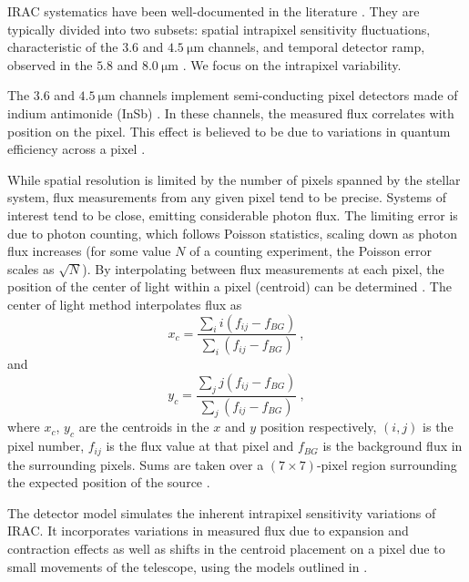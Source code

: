 \documentclass[twocolumn]{aastex61}
\begin{document}
IRAC systematics have been well-documented in the literature \citep[e.g.][]{charbonneau2005,agol2010,stevenson2012}.
They are typically divided into two subsets: spatial intrapixel sensitivity fluctuations, characteristic of the $3.6$ and $4.5~\mathrm{\mu m}$ channels, and temporal detector ramp, observed in the $5.8$ and $8.0~\mathrm{\mu m}$ \citep{charbonneau2005,evans2015}. We focus on the intrapixel variability.

The $3.6$ and $4.5~\mathrm{\mu m}$ channels implement semi-conducting pixel detectors made of indium antimonide (InSb) \citep{evans2015}. In these channels, the measured flux correlates with position on the pixel. This effect is believed to be due to variations in quantum efficiency across a pixel \citep{evans2015}.

While spatial resolution is limited by the number of pixels spanned by the stellar system, flux measurements from any given pixel tend to be precise. Systems of interest tend to be close, emitting considerable photon flux. The limiting error is due to photon counting, which follows Poisson statistics, scaling down as photon flux increases (for some value $N$ of a counting experiment, the Poisson error scales as $\sqrt{N}$). By interpolating between flux measurements at each pixel, the position of the center of light within a pixel (centroid) can be determined \citep{ingalls2016}. The center of light method interpolates flux as
\begin{equation}
  x_{c} = \dfrac{\sum_{i} i\left(f_{ij}-f_{BG}\right)}{\sum_{i} \left(f_{ij}-f_{BG}\right)}\ ,
\end{equation}
and
\begin{equation}
  y_{c} = \dfrac{\sum_{j} j\left(f_{ij}-f_{BG}\right)}{\sum_{j} \left(f_{ij}-f_{BG}\right)}\ ,
\end{equation}
where $x_{c}$, $y_{c}$ are the centroids in the $x$ and $y$ position respectively, $\left(i,j\right)$ is the pixel number, $f_{ij}$ is the flux value at that pixel and $f_{BG}$ is the background flux in the surrounding pixels. Sums are taken over a $\left(7\times 7\right)$-pixel region surrounding the expected position of the source \citep{ingalls2016}.

The detector model simulates the inherent intrapixel sensitivity variations of IRAC. It incorporates variations in measured flux due to expansion and contraction effects as well as shifts in the centroid placement on a pixel due to small movements of the telescope, using the models outlined in \citet{grillmair2014}.
\end{document}
